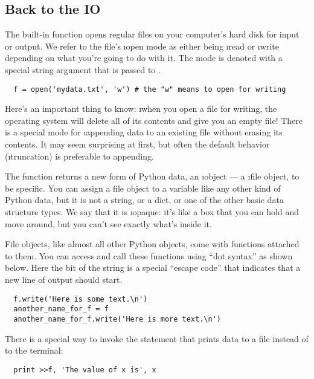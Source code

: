 \documentclass[letterpaper, 12pt, titlepage, twoside]{article}
\begin{document}
\subsection*{Back to the IO}

The built-in  function opens regular files on your computer's hard
disk for input or output. We refer to the file's \i{open mode} as either being
\i{read} or \i{write} depending on what you're going to do with it. The mode
is denoted with a special string argument that is passed to .

\begin{lstlisting}
  f = open('mydata.txt', 'w') # the "w" means to open for writing
\end{lstlisting}

Here's an important thing to know: \i{when you open a file for writing, the
  operating system will delete all of its contents and give you an empty
  file!} There is a special  mode for \i{appending} data to an existing
file without erasing its contents. It may seem surprising at first, but often
the default behavior (\i{truncation}) is preferable to appending.

The  function returns a new form of Python data, an \i{object} --- a
\i{file object}, to be specific. You can assign a file object to a variable
like any other kind of Python data, but it is not a string, or a dict, or one
of the other basic data structure types. We say that it is \i{opaque}: it's
like a box that you can hold and move around, but you can't see exactly what's
inside it.

File objects, like almost all other Python objects, come with functions
attached to them. You can access and call these functions using ``dot syntax''
as shown below. Here the  bit of the string is a special
``escape code'' that indicates that a new line of output should start.

\begin{lstlisting}
  f.write('Here is some text.\n')
  another_name_for_f = f
  another_name_for_f.write('Here is more text.\n')
\end{lstlisting}

There is a special way to invoke the  statement that prints data to a
file instead of to the terminal:

\begin{lstlisting}
  print >>f, 'The value of x is', x
\end{lstlisting}
\end{document}
